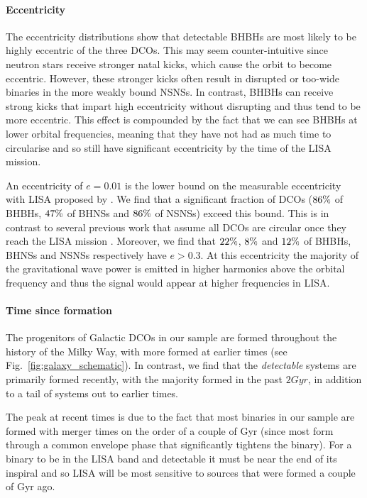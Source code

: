 \paragraph{Eccentricity} The eccentricity distributions show that detectable BHBHs are most likely to be highly eccentric of the three DCOs. This may seem counter-intuitive since neutron stars receive stronger natal kicks, which cause the orbit to become eccentric. However, these stronger kicks often result in disrupted or too-wide binaries in the more weakly bound NSNSs. In contrast, BHBHs can receive strong kicks that impart high eccentricity without disrupting and thus tend to be more eccentric. This effect is compounded by the fact that we can see BHBHs at lower orbital frequencies, meaning that they have not had as much time to circularise and so still have significant eccentricity by the time of the LISA mission.

An eccentricity of $e = 0.01$ is the lower bound on the measurable eccentricity with LISA proposed by \citet{Nishizawa+2016}. We find that a significant fraction of DCOs ($86\%{}$ of BHBHs, $47\%{}$ of BHNSs and $86\%{}$ of NSNSs) exceed this bound. This is in contrast to several previous work that assume all DCOs are circular once they reach the LISA mission \citep[e.g.][]{Lamberts+2018, Sesana+2020}. Moreover, we find that $22\%{}$, $8\%{}$ and $12\%{}$ of BHBHs, BHNSs and NSNSs respectively have $e > 0.3$. At this eccentricity the majority of the gravitational wave power is emitted in higher harmonics above the orbital frequency and thus the signal would appear at higher frequencies in LISA.

\paragraph{Time since formation} The progenitors of Galactic DCOs in our sample are formed throughout the history of the Milky Way, with more formed at earlier times (see Fig.~\ref{fig:galaxy_schematic}). In contrast, we find that the \textit{detectable} systems are primarily formed recently, with the majority formed in the past $2 \unit{Gyr}$, in addition to a tail of systems out to earlier times.

The peak at recent times is due to the fact that most binaries in our sample are formed with merger times on the order of a couple of Gyr (since most form through a common envelope phase that significantly tightens the binary). For a binary to be in the LISA band and detectable it must be near the end of its inspiral and so LISA will be most sensitive to sources that were formed a couple of Gyr ago.


